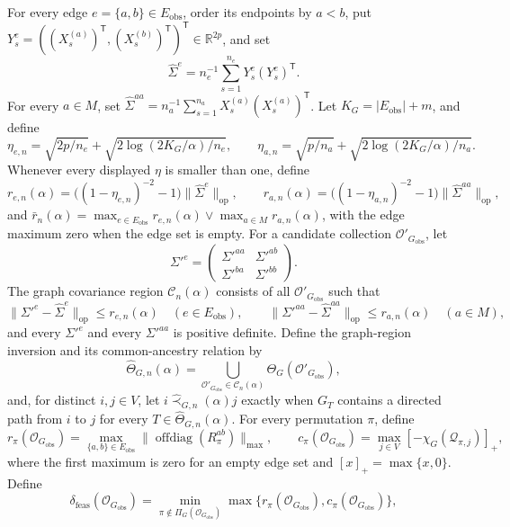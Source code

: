 For every edge \(e=\{a,b\}\in E_{\mathrm{obs}}\), order its endpoints by \(a<b\), put \(Y_s^e=((X_s^{(a)})^{\mathsf T},(X_s^{(b)})^{\mathsf T})^{\mathsf T}\in\mathbb R^{2p}\), and set
\[
\widehat\Sigma^e=n_e^{-1}\sum_{s=1}^{n_e}Y_s^e(Y_s^e)^{\mathsf T}.
\]
For every \(a\in M\), set \(\widehat\Sigma^{aa}=n_a^{-1}\sum_{s=1}^{n_a}X_s^{(a)}(X_s^{(a)})^{\mathsf T}\).  Let \(K_G=|E_{\mathrm{obs}}|+m\), and define
\[
\eta_{e,n}=\sqrt{2p/n_e}+\sqrt{2\log(2K_G/\alpha)/n_e},
\qquad
\eta_{a,n}=\sqrt{p/n_a}+\sqrt{2\log(2K_G/\alpha)/n_a}.
\]
Whenever every displayed \(\eta\) is smaller than one, define
\[
r_{e,n}(\alpha)=\bigl((1-\eta_{e,n})^{-2}-1\bigr)\|\widehat\Sigma^e\|_{\mathrm{op}},
\qquad
r_{a,n}(\alpha)=\bigl((1-\eta_{a,n})^{-2}-1\bigr)\|\widehat\Sigma^{aa}\|_{\mathrm{op}},
\]
and \(\bar r_n(\alpha)=\max_{e\in E_{\mathrm{obs}}}r_{e,n}(\alpha)\vee\max_{a\in M}r_{a,n}(\alpha)\), with the edge maximum zero when the edge set is empty.  For a candidate collection \(\mathcal O'_{G_{\mathrm{obs}}}\), let
\[
\Sigma'^e=
\begin{pmatrix}
\Sigma'^{aa}&\Sigma'^{ab}\\
\Sigma'^{ba}&\Sigma'^{bb}
\end{pmatrix}.
\]
The graph covariance region \(\mathcal C_n(\alpha)\) consists of all \(\mathcal O'_{G_{\mathrm{obs}}}\) such that
\[
\|\Sigma'^e-\widehat\Sigma^e\|_{\mathrm{op}}\le r_{e,n}(\alpha)\quad(e\in E_{\mathrm{obs}}),
\qquad
\|\Sigma'^{aa}-\widehat\Sigma^{aa}\|_{\mathrm{op}}\le r_{a,n}(\alpha)\quad(a\in M),
\]
and every \(\Sigma'^e\) and every \(\Sigma'^{aa}\) is positive definite.
Define the graph-region inversion and its common-ancestry relation by
\[
\widehat\Theta_{G,n}(\alpha)=
\bigcup_{\mathcal O'_{G_{\mathrm{obs}}}\in\mathcal C_n(\alpha)}
\Theta_G(\mathcal O'_{G_{\mathrm{obs}}}),
\]
and, for distinct \(i,j\in V\), let \(i\widehat\prec_{G,n}(\alpha)j\) exactly when \(G_T\) contains a directed path from \(i\) to \(j\) for every \(T\in\widehat\Theta_{G,n}(\alpha)\).
For every permutation \(\pi\), define
\[
r_\pi(\mathcal O_{G_{\mathrm{obs}}})=
\max_{\{a,b\}\in E_{\mathrm{obs}}}
\|\operatorname{offdiag}(R_\pi^{ab})\|_{\max},
\qquad
c_\pi(\mathcal O_{G_{\mathrm{obs}}})=
\max_{j\in V}[-\chi_G(\mathcal Q_{\pi,j})]_+,
\]
where the first maximum is zero for an empty edge set and \([x]_+=\max\{x,0\}\).  Define
\[
\delta_{\mathrm{feas}}(\mathcal O_{G_{\mathrm{obs}}})=
\min_{\pi\notin\Pi_G(\mathcal O_{G_{\mathrm{obs}}})}
\max\{r_\pi(\mathcal O_{G_{\mathrm{obs}}}),c_\pi(\mathcal O_{G_{\mathrm{obs}}})\},
\]
